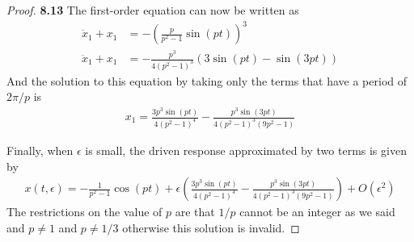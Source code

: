 \documentclass[11pt]{article}
\theoremstyle{definition}
\begin{document}
\begin{proof}{\textbf{8.13}}
        The ﬁrst-order equation can now be written as
        \begin{align*}
            \ddot{x}_1 + x_1 &= -\left(\frac{p}{p^2-1}\sin(pt)\right)^3\\
            \ddot{x}_1 + x_1 &= -\frac{p^3}{4(p^2-1)^3} (3\sin(pt) - \sin(3pt))
        \end{align*}
        And the solution to this equation by taking only the terms that have a
        period of $2\pi/p$ is 
        \begin{align*}
            x_1 = \frac{3p^3\sin(pt)}{4(p^2 - 1)^4}  - \frac{p^3\sin(3 p t)}{4(p^2-1)^3(9p^2-1)}
        \end{align*}

        Finally, when $\epsilon$ is small, the driven response approximated by
        two terms is given by
        \begin{align*}
            x(t,\epsilon) = - \frac{1}{p^2 -1 }\cos(pt) +
            \epsilon\left(\frac{3p^3\sin(pt)}{4(p^2 - 1)^4} -
            \frac{p^3\sin(3 p t)}{4(p^2-1)^3(9p^2-1)}\right) + O(\epsilon^2)
        \end{align*}
        The restrictions on the value of $p$ are that $1/p$ cannot be an integer
        as we said and $p \neq 1$ and $p \neq 1/3$ otherwise this solution is
        invalid. 
    \end{proof}
\end{document}
